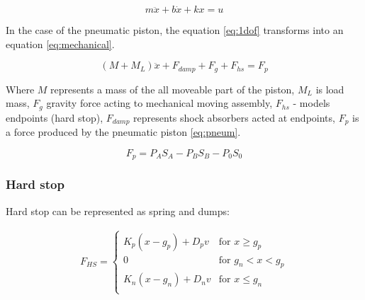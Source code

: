 \documentclass[class=article, crop=false]{standalone}
\begin{document}
\begin{equation}
    m\ddot{x} + b\dot{x} + kx = u
    \label{eq:1dof}
\end{equation}

%
%


In the case of the pneumatic piston, the equation \ref{eq:1dof}
transforms into an equation \ref{eq:mechanical}.

\begin{equation}
    (M + M_L) \ddot{x} + F_{damp} + F_g + F_{hs}  = F_p
    \label{eq:mechanical}
\end{equation}

Where $M$ represents a mass of the all moveable part of the piston,
$M_L$ is load mass, $F_g$ gravity force acting to mechanical moving assembly,
$F_{hs}$ - models endpoints (hard stop),
$F_{damp}$ represents shock absorbers acted at endpoints,
$F_{p}$ is a force produced by the pneumatic piston \ref{eq:pneum}.

\begin{equation}
    F_p = P_A S_A - P_B S_B - P_0 S_0
    \label{eq:pneum}
\end{equation}

\subsubsection{Hard stop}
Hard stop can be represented as spring and dumps:

\begin{align}
    F_{HS} =
    \begin{cases}
        K_p(x-g_p) + D_pv & \text{for } x \ge g_p \\
        0 & \text{for } g_n < x < g_p \\
        K_n(x-g_n) + D_nv & \text{for } x \le g_n \\
    \end{cases}
\end{align}
\end{document}
